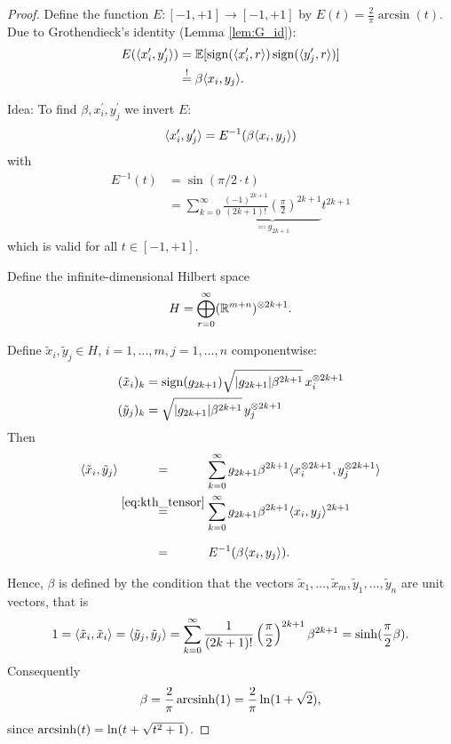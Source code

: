 	\begin{proof}
		Define the function $E: [-1,+1] \to [-1,+1]$ by $E(t)=\frac{2}{\pi}\arcsin(t)$. Due to Grothendieck's identity (Lemma \ref{lem:G_id}):
		\begin{align*}
			E(\langle{x_i^\prime},{y_j^\prime}\rangle ) &= \mathbb{E}[\operatorname{sign}(\langle{x_i^\prime},{r}\rangle)\operatorname{sign}(\langle{y_j^\prime},{r}\rangle)]\\
			&\overset{!}{=}\beta \langle{x_i},{y_j}\rangle.
		\end{align*}
		
		\noindent Idea: To find $\beta,x_i^\prime,y_j^\prime$ we invert $E$:
		\[
			\langle{x_i^\prime},{y_j^\prime}\rangle = E^{-1} (\beta \langle{x_i},{y_j}\rangle)	
		\]
		with 
		\begin{align*}
			E^{-1}(t) &= \sin(\pi/2 \cdot t) \\
			&= \sum_{k=0}^\infty \underbrace{\frac{(-1)^{2k+1}}{(2k+1)!}\left(\frac{\pi}{2}\right)^{2k+1}}_{\eqqcolon g_{2k+1}}  t^{2k+1}
		\end{align*}
		which is valid for all $t\in[-1,+1]$.
		
		Define the infinite-dimensional Hilbert space
		\begin{equation}
			H= \bigoplus_{r=0}^\infty (\mathbb{R}^{m+n})^{\otimes 2k+1}.
		\end{equation}
		
		Define $\tilde{x}_i, \tilde{y}_j\in H$, $i=1,\dots,m,j=1,\dots,n$ componentwise:
		\begin{align}
			(\tilde{x}_i)_k &= \operatorname{sign}(g_{2k+1}) \sqrt{{\left|{g_{2k+1}}\right|}\beta^{2k+1}}\, x_i^{\otimes 2k+1} \\
			(\tilde{y}_j)_k &= \sqrt{{\left|{g_{2k+1}}\right|}\beta^{2k+1}} \,y_j^{\otimes 2k+1}
		\end{align}
		Then 
		\begin{align*}
			\sclr{\tilde{x}_i}{\tilde{y}_j} &\overset{\textcolor{white}{\eqref*{eq:kth_tensor}}}{=} \sum_{k=0}^\infty g_{2k+1} \beta^{2k+1}\sclr{x_i^{\tensor 2k+1}}{y_j^{\tensor 2k+1}} \\
			&\overset{\eqref{eq:kth_tensor}}{=} \sum_{k=0}^\infty g_{2k+1} \beta^{2k+1} \sclr{x_i}{y_j}^{2k+1} \\
			&\overset{\textcolor{white}{\eqref*{eq:kth_tensor}}}{=} E^{-1}(\beta \sclr{x_i}{y_j}).
		\end{align*}
		
		Hence, $\beta$ is defined by the condition that the vectors $\tilde{x}_1,\dots,\tilde{x}_m,\tilde{y}_1,\dots,\tilde{y}_n$ are unit vectors, that is
		\[
			1 = \langle{\tilde{x}_i},{\tilde{x}_i}\rangle = \langle{\tilde{y}_j},{\tilde{y}_j}\rangle
			= \sum_{k=0}^\infty \frac{1}{(2k+1)!}\left(\frac{\pi}{2}\right)^{2k+1}\beta^{2k+1}=\sinh(\frac{\pi}{2}\beta).
		\]
		Consequently
		\[
			\beta = \frac{2}{\pi} \operatorname{arcsinh}(1) = \frac{2}{\pi}\ln(1+\sqrt{2}),	
		\]
		since $\operatorname{arcsinh} (t) = \ln(t+\sqrt{t^2+1})$.
	

\end{proof}
